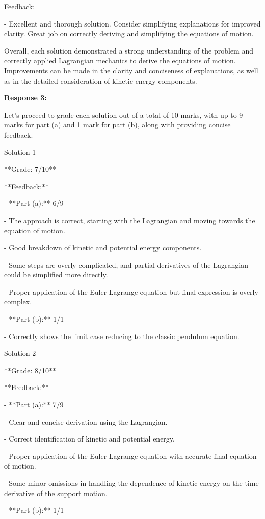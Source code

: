 \documentclass[a4paper,11pt]{article}
\begin{document}
Feedback:

- Excellent and thorough solution. Consider simplifying explanations for improved clarity. Great job on correctly deriving and simplifying the equations of motion. 

Overall, each solution demonstrated a strong understanding of the problem and correctly applied Lagrangian mechanics to derive the equations of motion. Improvements can be made in the clarity and conciseness of explanations, as well as in the detailed consideration of kinetic energy components.

\bigskip
\textbf{Response 3:}

Let's proceed to grade each solution out of a total of 10 marks, with up to 9 marks for part (a) and 1 mark for part (b), along with providing concise feedback.

Solution 1

**Grade: 7/10**

**Feedback:**

- **Part (a):** 6/9
  
  - The approach is correct, starting with the Lagrangian and moving towards the equation of motion.
 
  - Good breakdown of kinetic and potential energy components.
 
  - Some steps are overly complicated, and partial derivatives of the Lagrangian could be simplified more directly.
  
  - Proper application of the Euler-Lagrange equation but final expression is overly complex.

- **Part (b):** 1/1
  
  - Correctly shows the limit case reducing to the classic pendulum equation.

Solution 2

**Grade: 8/10**

**Feedback:**

- **Part (a):** 7/9
  
  - Clear and concise derivation using the Lagrangian.
  
  - Correct identification of kinetic and potential energy.
  
  - Proper application of the Euler-Lagrange equation with accurate final equation of motion.
  
  - Some minor omissions in handling the dependence of kinetic energy on the time derivative of the support motion.

- **Part (b):** 1/1
  
\end{document}
